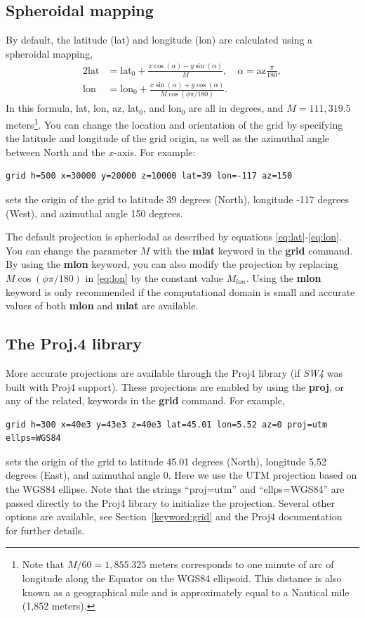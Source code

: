 \documentclass[11pt]{report}
\begin{document}
\subsection{Spheroidal mapping}
By default, the latitude (lat) and longitude (lon) are calculated using a spheroidal mapping,
\begin{alignat}{2}
\mbox{lat} &= \mbox{lat$_0$} + \frac{x\cos(\alpha) - y\sin(\alpha)}{M},\quad \alpha =
\mbox{az}\frac{\pi}{180}, \label{eq:lat}\\
\mbox{lon} &= \mbox{lon$_0$} + \frac{x\sin(\alpha ) + y\cos(\alpha)}{M\cos(\phi \pi/180)}.\label{eq:lon}
\end{alignat}
In this formula, lat, lon, az, lat$_0$, and lon$_0$ are all in degrees, and $M = 111,319.5$
meters\footnote{Note that $M/60 = 1,855.325$ meters corresponds to one minute of arc of
 longitude along the Equator on the WGS84 ellipsoid. This distance is also known as a geographical
  mile and is approximately equal to a Nautical mile (1,852 meters).}.  You can change the location
and orientation of the grid by specifying the latitude and longitude of the grid origin, as well as
the azimuthal angle between North and the $x$-axis. For example:
\begin{verbatim}
grid h=500 x=30000 y=20000 z=10000 lat=39 lon=-117 az=150
\end{verbatim}
sets the origin of the grid to latitude 39 degrees (North), longitude -117 degrees
(West), and azimuthal angle 150 degrees.

The default projection is spheriodal as described by equations \eqref{eq:lat}-\eqref{eq:lon}. You
can change the parameter $M$ with the {\bf mlat} keyword in the {\bf grid} command. By using the
{\bf mlon} keyword, you can also modify the projection by replacing $M\cos(\phi\pi/180)$ in
\eqref{eq:lon} by the constant value $M_{lon}$. Using the {\bf mlon} keyword is only recommended if
the computational domain is small and accurate values of both {\bf mlon} and {\bf mlat} are
available.

\subsection{The Proj.4 library}
More accurate projections are available through the Proj4 library (if
\emph{SW4} was built with Proj4 support). These projections are enabled by using the {\bf proj},
or any of the related, keywords in the {\bf grid} command. For example,
\begin{verbatim}
grid h=300 x=40e3 y=43e3 z=40e3 lat=45.01 lon=5.52 az=0 proj=utm ellps=WGS84
\end{verbatim}
sets the origin of the grid to latitude 45.01 degrees (North), longitude 5.52 degrees (East), and
azimuthal angle 0. Here we use the UTM projection based on the WGS84 ellipse. Note that the strings
``proj=utm'' and ``ellps=WGS84'' are passed directly to the Proj4 library to initialize the
projection. Several other options are available, see Section~\ref{keyword:grid} and the Proj4
documentation~\cite{Proj4} for further details.
\end{document}
